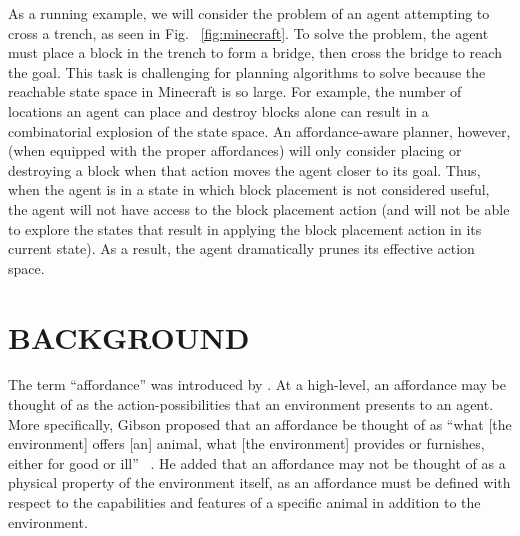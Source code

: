 \documentclass[]{article}
\begin{document}
As a running example, we will consider the problem of an agent attempting to cross a trench, as seen in Fig. ~\ref{fig:minecraft}.
To solve the problem, the agent must place a block in the trench to
form a bridge, then cross the bridge to reach the goal.  This task is
challenging for planning algorithms to solve because the reachable
state space in Minecraft is so large. For example, the number of
locations an agent can place and destroy blocks alone can result in a
combinatorial explosion of the state space. An affordance-aware
planner, however, (when equipped with the proper affordances) will
only consider placing or destroying a block when that action moves
the agent closer to its goal. Thus, when the agent is in a state in
which block placement is not considered useful, the agent will not
have access to the block placement action (and will not be able to
explore the states that result in applying the block placement action
in its current state). As a result, the agent dramatically prunes its
effective action space.





\section{BACKGROUND}


The term ``affordance'' was introduced by \citet{gibson77}. At a
high-level, an affordance may be thought of as the
action-possibilities that an environment presents to an agent. More
specifically, Gibson proposed that an affordance be thought of as
``what [the environment] offers [an] animal, what [the environment]
provides or furnishes, either for good or ill'' ~\citep{gibson77}. He
added that an affordance may not be thought of as a physical property
of the environment itself, as an affordance must be defined with
respect to the capabilities and features of a specific animal in
addition to the environment.
\end{document}
